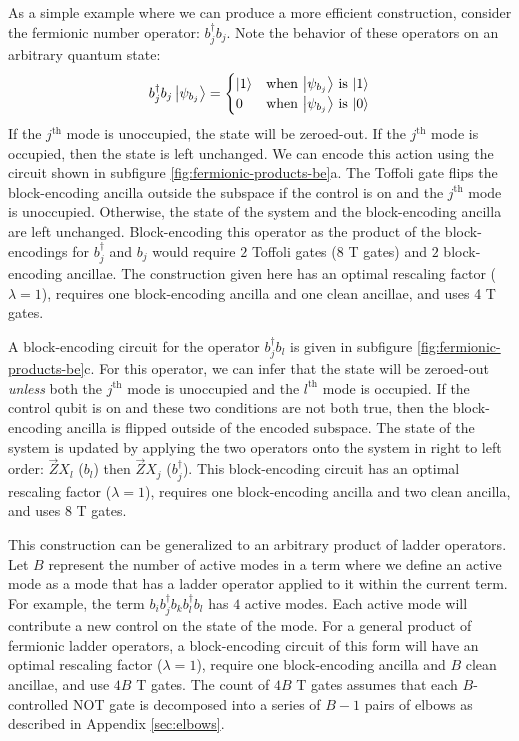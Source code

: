 As a simple example where we can produce a more efficient construction, consider the fermionic number operator: $b_j^\dagger b_j$.
Note the behavior of these operators on an arbitrary quantum state:
\begin{equation}
    \begin{split}
        b_j^\dagger b_j \ket{\psi_{b_j}} = \begin{cases} 
            \ket{1} & \text{when $\ket{\psi_{b_j}}$ is $\ket{1}$} \\
            0 & \text{when $\ket{\psi_{b_j}}$ is $\ket{0}$} \\
                                        \end{cases}
    \end{split}
\end{equation}
If the $j^\text{th}$ mode is unoccupied, the state will be zeroed-out.
If the $j^\text{th}$ mode is occupied, then the state is left unchanged.
We can encode this action using the circuit shown in subfigure \ref{fig:fermionic-products-be}a.
The Toffoli gate flips the block-encoding ancilla outside the subspace if the control is on and the $j^\text{th}$ mode is unoccupied.
Otherwise, the state of the system and the block-encoding ancilla are left unchanged.
Block-encoding this operator as the product of the block-encodings for $b_j^\dagger$ and $b_j$ would require $2$ Toffoli gates ($8$ T gates) and $2$ block-encoding ancillae.
The construction given here has an optimal rescaling factor ($\lambda = 1$), requires one block-encoding ancilla and one clean ancillae, and uses 4 T gates.

A block-encoding circuit for the operator $b_j^\dagger b_l$ is given in subfigure \ref{fig:fermionic-products-be}c.
For this operator, we can infer that the state will be zeroed-out \textit{unless} both the $j^\text{th}$ mode is unoccupied and the $l^\text{th}$ mode is occupied.
If the control qubit is on and these two conditions are not both true, then the block-encoding ancilla is flipped outside of the encoded subspace.
The state of the system is updated by applying the two operators onto the system in right to left order: $\vec{Z}X_l$ ($b_l$) then $\vec{Z}X_j$ ($b_j^\dagger$).
This block-encoding circuit has an optimal rescaling factor ($\lambda = 1$), requires one block-encoding ancilla and two clean ancilla, and uses $8$ T gates.


This construction can be generalized to an arbitrary product of ladder operators.
Let $B$ represent the number of active modes in a term where we define an active mode as a mode that has a ladder operator applied to it within the current term.
For example, the term $b_i b_j^\dagger b_k b_l^\dagger b_l$ has $4$ active modes.
Each active mode will contribute a new control on the state of the mode.
For a general product of fermionic ladder operators, a block-encoding circuit of this form will have an optimal rescaling factor ($\lambda = 1$), require one block-encoding ancilla and $B$ clean ancillae, and use $4B$ T gates.
The count of $4B$ T gates assumes that each $B$-controlled NOT gate is decomposed into a series of $B-1$ pairs of elbows as described in Appendix \ref{sec:elbows}.

